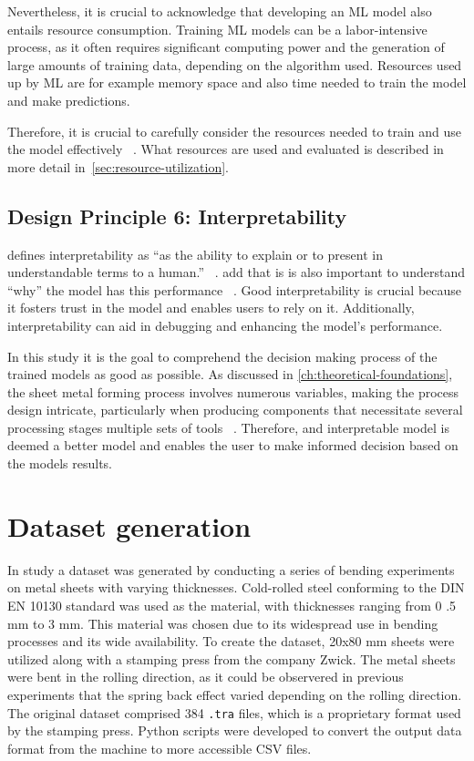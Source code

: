 Nevertheless, it is crucial to acknowledge that developing an \ac{ML} model also entails resource consumption.
Training \ac{ML} models can be a labor-intensive process, as it often requires significant
computing power and the generation of large amounts of training data, depending on the algorithm used.
Resources used up by \ac{ML} are for example memory space and also time needed to train the model and make predictions.

Therefore, it is crucial to carefully consider the resources needed to train and use the model
effectively
~\cite[p. 16]{siebert2022construction}.
What resources are used and evaluated is described in more detail in~\ref{sec:resource-utilization}.


\subsection*{Design Principle 6: Interpretability}

\cite{doshi2017towards} defines interpretability as ``as the ability to explain or to present in understandable
terms to a human.''
~\cite[p. w]{doshi2017towards}.
\cite{miller2019explanation} add that is is also important to understand ``why'' the model has this performance
~\cite[p. 1]{miller2019explanation}.
Good interpretability is crucial because it fosters trust in the model and enables users to rely on it.
Additionally, interpretability can aid in debugging and enhancing the model's performance.

In this study it is the goal to comprehend the decision making process of the trained models as good as possible.
As discussed in \cref{ch:theoretical-foundations}, the sheet metal forming process involves numerous
variables, making the process design intricate, particularly when producing components that necessitate several
processing stages multiple sets of tools
~\cite[p. 1]{dib_singleensembleclassifiers_2020}.
Therefore,  and interpretable model is deemed a better model and enables the user to make informed decision based
on the models results.


\section{Dataset generation}\label{sec:dataset-generation}
In study a dataset was generated by conducting a series of bending experiments on metal sheets with varying thicknesses.
Cold-rolled steel conforming to the DIN EN 10130 standard was used as the material, with thicknesses ranging from 0
.5 mm to 3 mm.
This material was chosen due to its widespread use in bending processes and its wide availability.
To create the dataset, 20x80 mm sheets were utilized along with a stamping press from the company Zwick.
The metal sheets were bent in the rolling direction, as it could be observered in previous experiments that the spring
back effect varied depending on the rolling direction.
The original dataset comprised 384 \texttt{.tra} files, which is a proprietary format used by the stamping press.
Python scripts were developed to convert the output data format from the machine to more accessible CSV files.

